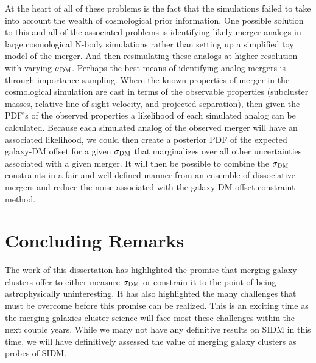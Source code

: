 At the heart of all of these problems is the fact that the simulations failed to take into account the wealth of cosmological prior information.
One possible solution to this and all of the associated problems is identifying likely merger analogs in large cosmological N-body simulations rather than setting up a simplified toy model of the merger.
And then resimulating these analogs at higher resolution with varying $\sigma_{\rm DM}$.
Perhaps the best means of identifying analog mergers is through importance sampling. 
Where the known properties of merger in the cosmological simulation are cast in terms of the observable properties (subcluster masses, relative line-of-sight velocity, and projected separation), then given the PDF's of the observed properties a likelihood of each simulated analog can be calculated.
Because each simulated analog of the observed merger will have an associated likelihood, we could then create a posterior PDF of the expected galaxy-DM offset for a given $\sigma_{\rm DM}$ that marginalizes over all other uncertainties associated with a given merger.
It will then be possible to combine the $\sigma_{\rm DM}$ constraints in a fair and well defined manner from an ensemble of dissociative mergers and reduce the noise associated with the galaxy-DM offset constraint method.

\section{Concluding Remarks}

The work of this dissertation has highlighted the promise that merging galaxy clusters offer to either measure $\sigma_{\rm DM}$ or constrain it to the point of being astrophysically uninteresting.
It has also highlighted the many challenges that must be overcome before this promise can be realized.
This is an exciting time as the merging galaxies cluster science will face most these challenges within the next couple years.
While we many not have any definitive results on SIDM in this time, we will have definitively assessed the value of merging galaxy clusters as probes of SIDM.

%



%
%  
